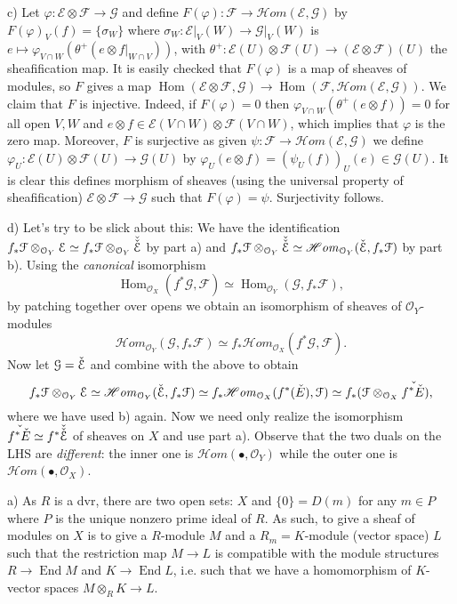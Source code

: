 \documentclass{report}
\newcommand{\F}{\mathcal{F}}
\newcommand{\E}{\mathcal{E}}
\renewcommand{\O}{\mathcal{O}}
\newcommand{\G}{\mathcal{G}}
\newcommand{\HOM}{\mathscr{H}\mathit{om}}
\DeclareMathOperator{\Hom}{Hom}
\DeclareMathOperator{\End}{End}
\begin{document}
 \noindent
 c)	Let $\varphi:\E\otimes\F\rightarrow \G$ and define $F(\varphi):\F\rightarrow\HOM(\E,\G)$
 by $F(\varphi)_V(f)=\{\sigma_W\}$ where $\sigma_W:\E\big|_V(W)\rightarrow \G\big|_V(W)$ is 
 $e\mapsto \varphi_{V\cap W}(\theta^+(e\otimes f\big|_{W\cap V}))$, with $\theta^+:\E(U)\otimes \F(U)\rightarrow (\E\otimes \F)(U)$
 the sheafification map.
 It is easily checked that $F(\varphi)$ is a map of sheaves of modules, so $F$ gives a map
 $\Hom(\E\otimes\F,\G)\rightarrow \Hom(\F,\HOM(\E,\G))$.  We claim that $F$ is injective.
 Indeed, if $F(\varphi)=0$ then $\varphi_{V\cap W}(\theta^+(e\otimes f))=0$ for all open $V,W$ and $e\otimes f\in \E(V\cap W)\otimes \F(V\cap W)$,
 which implies that $\varphi$ is the zero map.
 Moreover, $F$ is surjective as given $\psi:\F\rightarrow\HOM(\E,\G)$
 we define $\varphi_U:\E(U)\otimes \F(U)\rightarrow \G(U)$
 by $\varphi_U(e\otimes f)=(\psi_U(f))_U(e)\in\G(U)$.  It is clear this defines morphism of sheaves (using the universal property
 of sheafification) $\E\otimes\F\rightarrow \G$ such that $F(\varphi)=\psi$.	Surjectivity follows.
 
 \noindent
 d)	Let's try to be slick about this:	We have the identification $f_*\F\otimes_{\O_Y} \E\simeq f_*\F\otimes_{\O_Y} \Check{\Check{\E}}$
 by part a) and $f_*\F\otimes_{\O_Y} \Check{\Check{\E}}\simeq \HOM_{\O_Y}(\Check{\E},f_*\F)$ by part b).
 Using the {\em canonical} isomorphism
 $$\Hom_{\O_X}(f^*\G,\F)\simeq \Hom_{\O_Y}(\G,f_*\F),$$ by patching together over opens we obtain an isomorphism
 of sheaves of $\O_Y$-modules
 $$\HOM_{\O_Y}(\G,f_*\F)\simeq f_*\HOM_{\O_X}(f^*\G,\F).$$
Now let $\G=\Check{\E}$ and combine with the above to obtain
$$f_*\F\otimes_{\O_Y} \E\simeq \HOM_{\O_Y}(\Check{\E},f_*\F)\simeq 
f_*\HOM_{\O_X}(f^*(\Check{E}),\F)\simeq f_*(\F\otimes_{\O_X}\Check{f^*\Check{E}}),$$
where we have used b) again.
Now we need only realize the isomorphism $\Check{f^*\Check{E}}\simeq f^*\Check{\Check{\E}}$ of sheaves on $X$
and use part a).  Observe that the two duals on the LHS are {\em different}: the inner one is $\HOM(\bullet, \O_Y)$ while the outer one
is $\HOM(\bullet,\O_X)$.	


\bigskip
{}	a)	As $R$ is a dvr, there are two open sets: $X$ and $\{0\}=D(m)$ for any $m\in P$ where $P$ is the unique nonzero
prime ideal of $R$.  As such, to give a sheaf of modules on $X$ is to give a $R$-module $M$ and a $R_m=K$-module (vector space)
$L$ such that the restriction map $M\rightarrow L$ is compatible with the module structures $R\rightarrow \End M$ and $K\rightarrow \End L$,
i.e. such that we have a homomorphism of $K$-vector spaces $M\otimes_R K\rightarrow L$.
\end{document}

